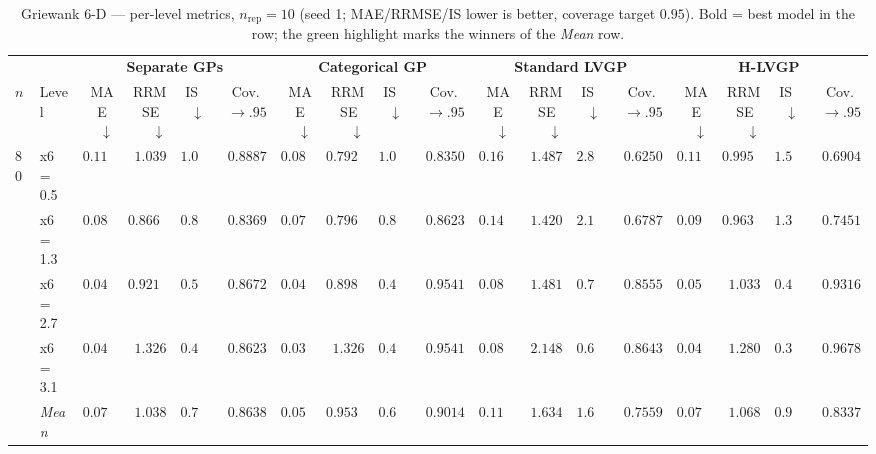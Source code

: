 \begin{table}[htbp]
\centering
\scriptsize
\setlength{\tabcolsep}{2.5pt}
\setlength{\fboxsep}{1pt}
\caption{Griewank 6-D --- per-level metrics, $n_{\mathrm{rep}}=10$ (seed 1; MAE/RRMSE/IS lower is better, coverage target $0.95$). Bold = best model in the row; the green highlight marks the winners of the \emph{Mean} row.}
\label{tab:griewank_6d_nrep10}
\begin{tabular}{llrrrrrrrrrrrrrrrr}
\toprule
 & & \multicolumn{4}{c}{\textbf{Separate GPs}} & \multicolumn{4}{c}{\textbf{Categorical GP}} & \multicolumn{4}{c}{\textbf{Standard LVGP}} & \multicolumn{4}{c}{\textbf{H-LVGP}} \\
\cmidrule(lr){3-6} \cmidrule(lr){7-10} \cmidrule(lr){11-14} \cmidrule(lr){15-18}
$n$ & Level & MAE~$\downarrow$ & RRMSE~$\downarrow$ & IS~$\downarrow$ & Cov.~$\to.95$ & MAE~$\downarrow$ & RRMSE~$\downarrow$ & IS~$\downarrow$ & Cov.~$\to.95$ & MAE~$\downarrow$ & RRMSE~$\downarrow$ & IS~$\downarrow$ & Cov.~$\to.95$ & MAE~$\downarrow$ & RRMSE~$\downarrow$ & IS~$\downarrow$ & Cov.~$\to.95$ \\
\midrule
\multirow{5}{*}{80} & x6 = 0.5 & $0.1124$ & $1.039$ & $1.094$ & {\boldmath$0.8887$} & {\boldmath$0.0812$} & {\boldmath$0.7925$} & {\boldmath$1.017$} & $0.8350$ & $0.1689$ & $1.487$ & $2.812$ & $0.6250$ & $0.1195$ & $0.9957$ & $1.528$ & $0.6904$ \\
 & x6 = 1.3 & $0.0844$ & $0.8664$ & $0.8943$ & $0.8369$ & {\boldmath$0.0712$} & {\boldmath$0.7962$} & {\boldmath$0.8518$} & {\boldmath$0.8623$} & $0.1409$ & $1.420$ & $2.162$ & $0.6787$ & $0.0939$ & $0.9630$ & $1.303$ & $0.7451$ \\
 & x6 = 2.7 & {\boldmath$0.0423$} & $0.9214$ & $0.5231$ & $0.8672$ & $0.0434$ & {\boldmath$0.8983$} & {\boldmath$0.4172$} & {\boldmath$0.9541$} & $0.0811$ & $1.481$ & $0.7551$ & $0.8555$ & $0.0542$ & $1.033$ & $0.4656$ & $0.9316$ \\
 & x6 = 3.1 & $0.0478$ & $1.326$ & $0.4536$ & $0.8623$ & {\boldmath$0.0398$} & $1.326$ & $0.4488$ & {\boldmath$0.9541$} & $0.0852$ & $2.148$ & $0.6717$ & $0.8643$ & $0.0461$ & {\boldmath$1.280$} & {\boldmath$0.3360$} & $0.9678$ \\
 & \textit{Mean} & $0.0717$ & $1.038$ & $0.7414$ & $0.8638$ & \colorbox{green!20}{\boldmath$0.0589$} & \colorbox{green!20}{\boldmath$0.9533$} & \colorbox{green!20}{\boldmath$0.6838$} & \colorbox{green!20}{\boldmath$0.9014$} & $0.1190$ & $1.634$ & $1.600$ & $0.7559$ & $0.0784$ & $1.068$ & $0.9081$ & $0.8337$ \\
\midrule

\end{tabular}
\end{table}
